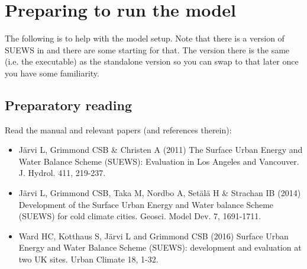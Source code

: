 \documentclass[letterpaper,10pt,english]{sphinxmanual}
\begin{document}
\begin{figure}[htbp]
\centering

\noindent{}
\end{figure}


\chapter{Preparing to run the model}
\label{\detokenize{prepare-to-run-the-model::doc}}\label{\detokenize{prepare-to-run-the-model:preparing-to-run-the-model}}
The following is to help with the model setup. Note that there is a
version of SUEWS in 
and there are some starting
 for
that. The version there is the same (i.e. the executable) as the
standalone version so you can swap to that later once you have some
familiarity.


\section{Preparatory reading}
\label{\detokenize{prepare-to-run-the-model:preparatory-reading}}
Read the manual and relevant papers (and references therein):
\begin{itemize}
\item {} 
Järvi L, Grimmond CSB \& Christen A (2011) The Surface Urban Energy
and Water Balance Scheme (SUEWS): Evaluation in Los Angeles and
Vancouver. J. Hydrol. 411, 219-237.

\item {} 
Järvi L, Grimmond CSB, Taka M, Nordbo A, Setälä H \& Strachan IB
(2014) Development of the Surface Urban Energy and Water balance
Scheme (SUEWS) for cold climate cities. Geosci. Model Dev. 7,
1691-1711.

\item {} 
Ward HC, Kotthaus S, Järvi L and Grimmond CSB (2016) Surface Urban
Energy and Water Balance Scheme (SUEWS): development and evaluation
at two UK sites. Urban Climate 18, 1-32.

\end{itemize}
\end{document}
